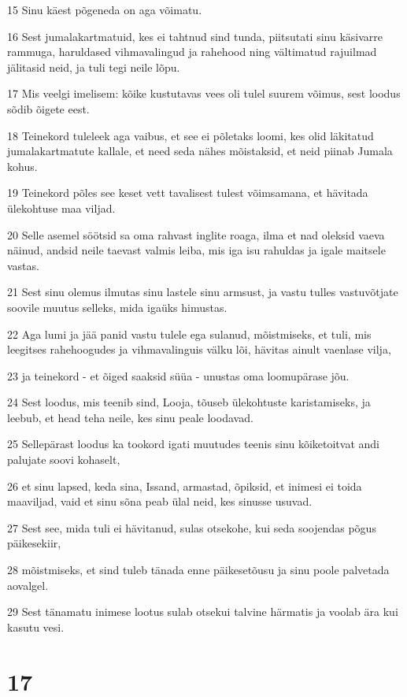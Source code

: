 \par 15 Sinu käest põgeneda on aga võimatu.
\par 16 Sest jumalakartmatuid, kes ei tahtnud sind tunda, piitsutati sinu käsivarre rammuga, haruldased vihmavalingud ja rahehood ning vältimatud rajuilmad jälitasid neid, ja tuli tegi neile lõpu.
\par 17 Mis veelgi imelisem: kõike kustutavas vees oli tulel suurem võimus, sest loodus sõdib õigete eest.
\par 18 Teinekord tuleleek aga vaibus, et see ei põletaks loomi, kes olid läkitatud jumalakartmatute kallale, et need seda nähes mõistaksid, et neid piinab Jumala kohus.
\par 19 Teinekord põles see keset vett tavalisest tulest võimsamana, et hävitada ülekohtuse maa viljad.
\par 20 Selle asemel söötsid sa oma rahvast inglite roaga, ilma et nad oleksid vaeva näinud, andsid neile taevast valmis leiba, mis iga isu rahuldas ja igale maitsele vastas.
\par 21 Sest sinu olemus ilmutas sinu lastele sinu armsust, ja vastu tulles vastuvõtjate soovile muutus selleks, mida igaüks himustas.
\par 22 Aga lumi ja jää panid vastu tulele ega sulanud, mõistmiseks, et tuli, mis leegitses rahehoogudes ja vihmavalinguis välku lõi, hävitas ainult vaenlase vilja,
\par 23 ja teinekord - et õiged saaksid süüa - unustas oma loomupärase jõu.
\par 24 Sest loodus, mis teenib sind, Looja, tõuseb ülekohtuste karistamiseks, ja leebub, et head teha neile, kes sinu peale loodavad.
\par 25 Sellepärast loodus ka tookord igati muutudes teenis sinu kõiketoitvat andi palujate soovi kohaselt,
\par 26 et sinu lapsed, keda sina, Issand, armastad, õpiksid, et inimesi ei toida maaviljad, vaid et sinu sõna peab ülal neid, kes sinusse usuvad.
\par 27 Sest see, mida tuli ei hävitanud, sulas otsekohe, kui seda soojendas põgus päikesekiir,
\par 28 mõistmiseks, et sind tuleb tänada enne päikesetõusu ja sinu poole palvetada aovalgel.
\par 29 Sest tänamatu inimese lootus sulab otsekui talvine härmatis ja voolab ära kui kasutu vesi. 

\chapter{17} 

